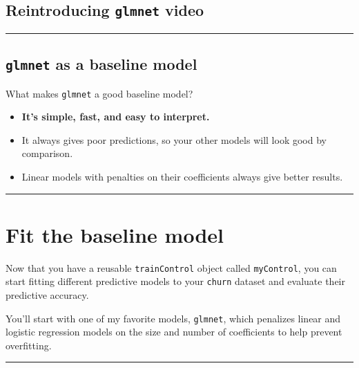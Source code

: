 \documentclass[]{book}
\begin{document}
\subsection*{\texorpdfstring{Reintroducing \texttt{glmnet}
video}{Reintroducing glmnet video}}\label{reintroducing-glmnet-video}

\begin{center}\rule{0.5\linewidth}{\linethickness}\end{center}

\subsection*{\texorpdfstring{\texttt{glmnet} as a baseline
model}{glmnet as a baseline model}}\label{glmnet-as-a-baseline-model}

What makes \texttt{glmnet} a good baseline model?

\begin{itemize}
\item
  \textbf{It's simple, fast, and easy to interpret.}
\item
  It always gives poor predictions, so your other models will look good
  by comparison.
\item
  Linear models with penalties on their coefficients always give better
  results.
\end{itemize}

\begin{center}\rule{0.5\linewidth}{\linethickness}\end{center}

\section{Fit the baseline model}\label{fit-the-baseline-model}

Now that you have a reusable \texttt{trainControl} object called
\texttt{myControl}, you can start fitting different predictive models to
your \texttt{churn} dataset and evaluate their predictive accuracy.

You'll start with one of my favorite models, \texttt{glmnet}, which
penalizes linear and logistic regression models on the size and number
of coefficients to help prevent overfitting.

\begin{center}\rule{0.5\linewidth}{\linethickness}\end{center}
\end{document}
